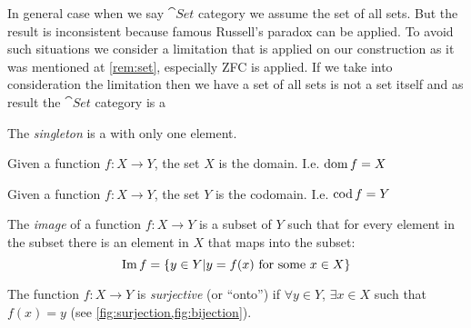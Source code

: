 \begin{remark}
  In general case when we say $\cat{Set}$ category we assume the set
  of all sets. But the result is inconsistent because famous Russell's
  paradox \cite{wiki:russell_paradox} can be applied. To avoid such
  situations we consider a limitation that is applied on our
  construction as it was mentioned at \cref{rem:set}, especially  
  ZFC \cite{wiki:zfc} is applied. If we take into consideration the
  limitation then we have a set of
  all sets is not a set itself and as result the  $\cat{Set}$
  category is a 
\end{remark}

\begin{definition}[Singleton]
\label{def:singleton_set} 
The \textit{singleton} is a  with only one element.
\end{definition}

\begin{example}[Domain]
  \label{ex:domain_set}
  Given a function $f: X \to Y$, the set $X$ is the domain. I.e. $\operatorname{dom}
  f = X$
\end{example}

\begin{example}[Codomain]
  \label{ex:codomain_set}
  Given a function $f: X \to Y$, the set $Y$ is the codomain. I.e.
  $\operatorname{cod} f = Y$
\end{example}

\begin{definition}[Image]
\label{def:function_image} 
The \textit{image} of a function $f: X \to Y$ is a subset of
 $Y$ such that for every element in the subset
there is an element in  $X$ that maps into the
subset:
\[
\operatorname{Im}{f} = \{y \in Y| y = f(x) \mbox{ for some } x \in X\}
\]
\end{definition}


\begin{definition}[Surjection]
  \label{def:surjection}
  The function $f: X \rightarrow Y$ is \textit{surjective} (or ``onto'') if
  $\forall y \in Y$, $\exists x \in X$ such that
  $f\left(x\right) = y$ (see \cref{fig:surjection,fig:bijection}).
\end{definition}

